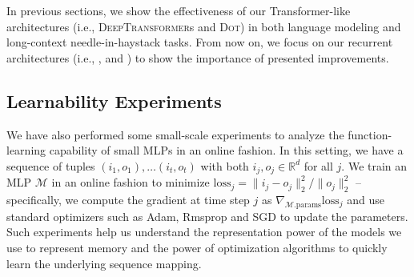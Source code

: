 In previous sections, we show the effectiveness of our Transformer-like architectures (i.e., \textsc{DeepTransformer}s and \textsc{Dot}) in both language modeling and long-context needle-in-haystack tasks. From now on, we focus on our recurrent architectures (i.e., \model, and \omodel) to show the importance of presented improvements. 




\subsection{Learnability Experiments}
We have also performed some small-scale experiments to analyze the function-learning capability of small MLPs in an online fashion. In this setting, we have a sequence of tuples $(i_1, o_1), \ldots (i_t, o_t)$ with both $i_j, o_j \in \mathbb{R}^d$ for all $j$. We train an MLP $\mathcal{M}$ in an online fashion to minimize $\text{loss}_j = \|{i_j - o_j}\|_2^2 / \|{o_j}\|_2^2$ -- specifically, we compute the gradient at time step $j$ as $\nabla_{\mathcal{M}\text{.params}} \text{loss}_j$  and use standard optimizers such as Adam, Rmsprop and SGD to update the parameters. Such experiments help us understand the representation power of the models we use to represent memory and the power of optimization algorithms to quickly learn the underlying sequence mapping.











